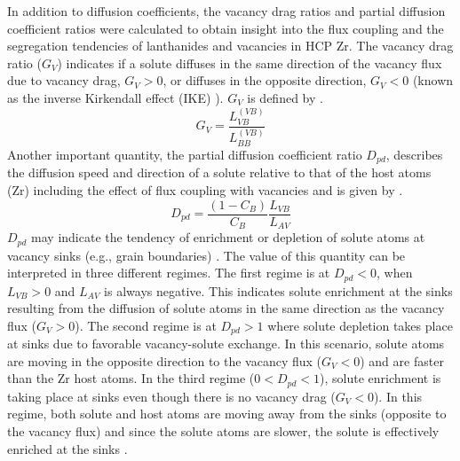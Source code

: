 \documentclass[preprint,12pt]{elsarticle}
\begin{document}
In addition to diffusion coefficients, the vacancy drag ratios and partial diffusion coefficient ratios were calculated to obtain insight into the flux coupling and the segregation tendencies of lanthanides and vacancies in HCP Zr. The vacancy drag ratio ($G_V$) indicates if a solute diffuses in the same direction of the vacancy flux due to vacancy drag, $G_V > 0$, or diffuses in the opposite direction, $G_V < 0$ (known as the inverse Kirkendall effect (IKE) \cite{marwick_segregation_1978}). $G_V$ is defined by .
\begin{equation}\label{eq:drag}
    G_V = \frac{L_{VB}^{(VB)}}{L_{BB}^{(VB)}}
\end{equation}
Another important quantity, the partial diffusion coefficient ratio $D_{pd}$, describes the diffusion speed and direction of a solute relative to that of the host atoms (Zr) including the effect of flux coupling with vacancies \cite{messina_solute_2020, messina_exact_2014} and is given by .
\begin{equation}\label{eq:pdc}
    D_{pd} = \frac{(1-C_B)}{C_B} \frac{L_{VB}}{L_{AV}}
\end{equation}
$D_{pd}$ may indicate the tendency of enrichment or depletion of solute atoms at vacancy sinks (e.g., grain boundaries) \cite{messina_exact_2014}. The value of this quantity can be interpreted in three different regimes. The first regime is at $D_{pd} < 0$, when $L_{VB} > 0$ and $L_{AV}$ is always negative. This indicates solute enrichment at the sinks resulting from the diffusion of solute atoms in the same direction as the vacancy flux ($G_V > 0$). The second regime is at $D_{pd} > 1$ where solute depletion takes place at sinks due to favorable vacancy-solute exchange. In this scenario, solute atoms are moving in the opposite direction to the vacancy flux ($G_V < 0$) and are faster than the Zr host atoms. In the third regime ($0 < D_{pd} < 1$), solute enrichment is taking place at sinks even though there is no vacancy drag ($G_V < 0$). In this regime, both solute and host atoms are moving away from the sinks (opposite to the vacancy flux) and since the solute atoms are slower, the solute is effectively enriched at the sinks \cite{messina_exact_2014}. 
\end{document}
